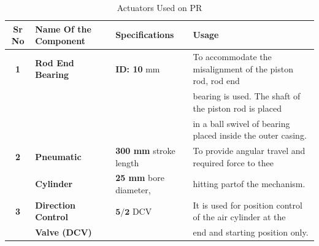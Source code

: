         \begin{table}[h]
            \caption {Actuators Used on PR} \label{Actuators_K}  \small
            \begin{tabular}{|c|l|l|l|}
                \hline  \hline
                \textbf{Sr No}  & \textbf{Name Of the Component}& \textbf{Specifications}               & \textbf{Usage}                                                   \\ \hline    \hline
                \textbf{1}      & \textbf{Rod End Bearing}      & \textbf{ID: 10 }mm                    & To accommodate the misalignment of the piston rod, rod end       \\
                                &                               &                                       & bearing is used. The shaft of the piston rod is placed           \\ 
                                &                               &                                       & in a ball swivel of bearing placed inside the outer casing.      \\ \hline
                \textbf{2}      & \textbf{Pneumatic }           & \textbf{300 mm} stroke length         & To provide angular travel and required force to thee             \\
                                & \textbf{Cylinder}             & \textbf{25 mm} bore diameter,         & hitting partof the mechanism.                                    \\ \hline 
                \textbf{3}      & \textbf{Direction Control}    & $\textbf{5/2}$ DCV                    & It is used for position control of the air cylinder at the       \\
                                & \textbf{Valve (DCV)}          &                                       & end and starting position only.                                  \\ \hline    \hline   
            \end{tabular}
        \end{table}


